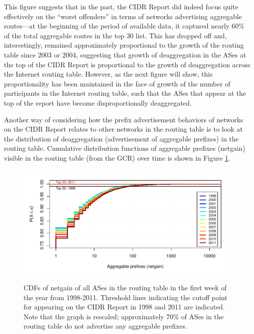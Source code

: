 This figure suggests that in the past, the CIDR Report did indeed focus quite
effectively on the ``worst offenders'' in terms of networks advertising
aggregable routes---at the beginning of the period of available data, it
captured nearly 60\% of the total aggregable routes in the top 30 list. This
has dropped off and, interestingly, remained approximately proportional to the
growth of the routing table since 2003 or 2004, suggesting that growth of
deaggregation in the ASes at the top of the CIDR Report is proportional to the
growth of deaggregation across the Internet routing table. However, as the next
figure will show, this proportionality has been maintained in the face of
growth of the number of participants in the Internet routing table, such that
the ASes that appear at the top of the report have become disproportionally
deaggregated.

Another way of considering how the prefix advertisement behaviors of networks
on the CIDR Report relates to other networks in the routing table is to look at
the distribution of deaggregation (advertisement of aggregable prefixes) in the
routing table. Cumulative distribution functions of aggregable prefixes
(netgain) visible in the routing table (from the GCR) over time is shown in
Figure \ref{fig:netgain_cdf}.

\begin{figure}[h!]
\begin{centering}
\begin{singlespace}
    \includegraphics[width=6in]{figures/netgain_cdf_gcr.pdf}
    \vspace{-2em}\\
    \caption{CDFs of netgain of all ASes in the routing table in the first week
    of the year from 1998-2011. Threshold lines indicating the cutoff point for
    appearing on the CIDR Report in 1998 and 2011 are indicated. Note that the
    graph is rescaled; approximately 70\% of ASes in the routing table do not
    advertise any aggregable prefixes.}
    \label{fig:netgain_cdf}
\end{singlespace}
\end{centering}
\end{figure}

